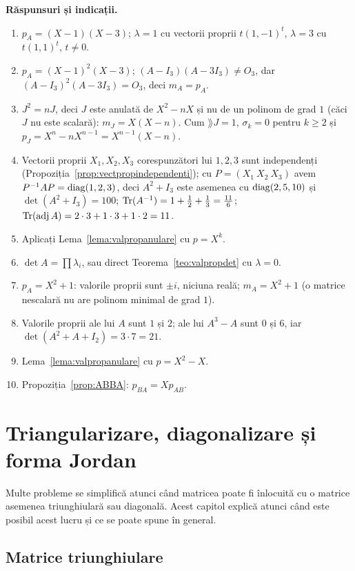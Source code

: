 \medskip\noindent\textbf{Răspunsuri și indicații.}
\begin{enumerate}[label=\textbf{\arabic*.},leftmargin=*]
\item $p_A=(X-1)(X-3)$; $\lambda=1$ cu vectorii proprii $t(1,-1)^t$, $\lambda=3$ cu $t(1,1)^t$, $t\neq0$.
\item $p_A=(X-1)^2(X-3)$; $(A-I_3)(A-3I_3)\neq O_3$, dar $(A-I_3)^2(A-3I_3)=O_3$, deci $m_A=p_A$.
\item $J^2=nJ$, deci $J$ este anulată de $X^2-nX$ și nu de un polinom de grad $1$ (căci $J$ nu este scalară): $m_J=X(X-n)$. Cum $\rang J=1$, $\sigma_k=0$ pentru $k\ge2$ și $p_J=X^n-nX^{n-1}=X^{n-1}(X-n)$.
\item Vectorii proprii $X_1,X_2,X_3$ corespunzători lui $1,2,3$ sunt independenți (Propoziția~\ref{prop:vectpropindependenti}); cu $P=(X_1\ X_2\ X_3)$ avem $P^{-1}AP=\operatorname{diag}(1,2,3)$, deci $A^2+I_3$ este asemenea cu $\operatorname{diag}(2,5,10)$ și $\det(A^2+I_3)=100$; $\operatorname{Tr}(A^{-1})=1+\frac12+\frac13=\frac{11}6$; $\operatorname{Tr}(\operatorname{adj} A)=2\cdot3+1\cdot3+1\cdot2=11$.
\item Aplicați Lema~\ref{lema:valpropanulare} cu $p=X^k$.
\item $\det A=\prod\lambda_i$, sau direct Teorema~\ref{teo:valpropdet} cu $\lambda=0$.
\item $p_A=X^2+1$: valorile proprii sunt $\pm i$, niciuna reală; $m_A=X^2+1$ (o matrice nescalară nu are polinom minimal de grad $1$).
\item Valorile proprii ale lui $A$ sunt $1$ și $2$; ale lui $A^3-A$ sunt $0$ și $6$, iar $\det(A^2+A+I_2)=3\cdot7=21$.
\item Lema~\ref{lema:valpropanulare} cu $p=X^2-X$.
\item Propoziția~\ref{prop:ABBA}: $p_{BA}=Xp_{AB}$.
\end{enumerate}

\chapter{Triangularizare, diagonalizare și forma Jordan}\label{ch:jordan}

Multe probleme se simplifică atunci când matricea poate fi înlocuită cu o matrice asemenea triunghiulară sau diagonală. Acest capitol explică atunci când este posibil acest lucru și ce se poate spune în general.

\section{Matrice triunghiulare}


